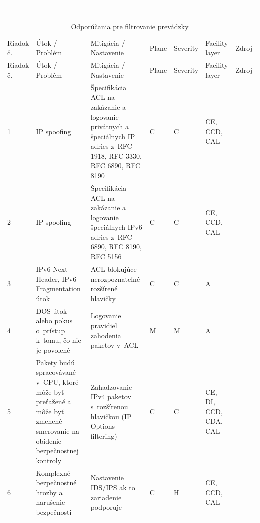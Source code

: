 \begin{longtable}[!htbp]{|C{2.5em}L{11em}L{11em}C{2.5em}C{4em}C{5em}L{2.5em}|}
	\cite{Jackson2010}
	
	\cite{CIS_DrTLsgXv24lxeIIM}\\
	
	\hline
	
\end{longtable}%


\begin{longtable}[!htbp]{|C{2.5em}L{11em}L{11em}C{2.5em}C{4em}C{5em}L{2.5em}|}
	\caption{Odporúčania pre filtrovanie prevádzky}
	\label{tab:filtering}\\ \hline
	\mbox{Riadok} č.&Útok / Problém	&Mitigácia / Nastavenie	&Plane	&Severity	&Facility layer	&Zdroj\\ \hhline{=======}
	\endfirsthead 
	\hline
	\centering
	
	Riadok č.	&Útok / Problém	&Mitigácia / Nastavenie	&Plane	&Severity	&Facility layer	&Zdroj\\ \hhline{=======}
	\endhead
	
	
	 1	&IP spoofing	&Špecifikácia ACL na zakázanie a logovanie privátnych a špeciálnych IP adries z~RFC 1918, RFC 3330, RFC 6890, RFC 8190	&C	&C	&CE,
	CCD,
	CAL	& \cite{Jackson2010}
	
	\cite{Singh2018}
	
	\cite{CIS_DrTLsgXv24lxeIIM}\\
	2	&IP spoofing	&Špecifikácia ACL na zakázanie a logovanie špeciálnych IPv6 adries z~RFC 6890, RFC 8190, RFC 5156	&C	&C	&CE,
	CCD,
	CAL	& \cite{Jackson2010}
	
	\cite{Singh2018}
	
	\cite{CIS_DrTLsgXv24lxeIIM}\\
	 3	&IPv6 Next Header,
	IPv6 Fragmentation útok	&ACL blokujúce nerozpoznateľné rozšírené hlavičky	&C	&C	&A	& \cite{Podermanski1922015}
	
	\cite{Gregr2622015}\\
	4	&DOS útok alebo pokus o~prístup k~tomu, čo nie je povolené	&Logovanie pravidiel zahodenia paketov v~ACL	&M	&M	&A	& \cite{Akin2002}\\
	 5	&Pakety budú spracovávané v~CPU, ktoré môže byť preťažené a môže byť zmenené smerovanie na obídenie bezpečnostnej kontroly	&Zahadzovanie IPv4 paketov s~rozšírenou hlavičkou (IP Options filtering)	&C	&C	&CE,
	DI,
	CCD,
	CDA,
	CAL	& \cite{Singh2018}\\
	6	&Komplexné bezpečnostné hrozby a narušenie bezpečnosti	&Nastavenie IDS/IPS ak to zariadenie podporuje	&C	&H	&CE, CCD,
	CAL	& \cite{Hucaby2010}\\
	\hline
\end{longtable}%
\newpage

